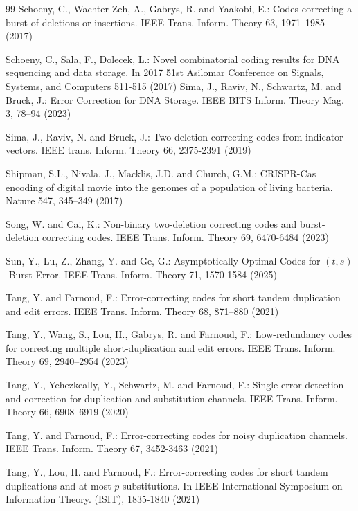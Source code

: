 \documentclass[pdflatex,sn-mathphys-num]{sn-jnl}
\theoremstyle{theorem}%
\theoremstyle{definition}
\theoremstyle{construction}
\newtheorem{open problem}{Open problem}
\begin{document}
\begin{thebibliography}{99}
		Schoeny, C., Wachter-Zeh, A., Gabrys, R. and Yaakobi, E.: 
		Codes correcting a burst of deletions or insertions. 
		IEEE Trans. Inform. Theory 63, 1971–1985 (2017)
		
		Schoeny, C., Sala, F., Dolecek, L.: Novel combinatorial coding results for DNA sequencing and data storage. In 2017 51st Asilomar Conference on Signals, Systems, and Computers 511-515 (2017)
		Sima, J., Raviv, N., Schwartz, M. and Bruck, J.: 
		Error Correction for DNA Storage. 
		IEEE BITS Inform. Theory Mag. 3, 78–94 (2023)
		
		Sima, J., Raviv, N. and Bruck, J.: Two deletion correcting codes from indicator vectors. IEEE trans. Inform. Theory 66, 2375-2391 (2019)
		
		Shipman, S.L., Nivala, J., Macklis, J.D. and Church, G.M.:
		CRISPR-Cas encoding of digital movie into the genomes of a population of living bacteria. 
		Nature 547, 345–349 (2017)
		
		Song, W. and Cai, K.: Non-binary two-deletion correcting codes and burst-deletion correcting codes. IEEE Trans. Inform. Theory 69, 6470-6484 (2023)
		
		 Sun, Y.,  Lu, Z., Zhang, Y. and Ge, G.: Asymptotically Optimal Codes for $(t, s)$-Burst Error. IEEE Trans. Inform. Theory 71, 1570-1584 (2025)

		
		Tang, Y. and Farnoud, F.: 
		Error-correcting codes for short tandem duplication and edit errors. 
		IEEE Trans. Inform. Theory 68, 871–880 (2021)
		
		Tang, Y., Wang, S., Lou, H., Gabrys, R. and Farnoud, F.: 
		Low-redundancy codes for correcting multiple short-duplication and edit errors. 
		IEEE Trans. Inform. Theory 69, 2940–2954 (2023)
		
		Tang, Y., Yehezkeally, Y., Schwartz, M. and Farnoud, F.: 
		Single-error detection and correction for duplication and substitution channels. 
		IEEE Trans. Inform. Theory 66, 6908–6919 (2020)
		
		Tang, Y. and Farnoud, F.:
		Error-correcting codes for noisy duplication channels.
		IEEE Trans. Inform. Theory  67, 3452-3463 (2021)
		
		Tang, Y., Lou, H. and Farnoud, F.: Error-correcting codes for short tandem duplications and at most $ p $ substitutions. In IEEE International Symposium on Information Theory. (ISIT), 1835-1840 (2021)
		

\end{thebibliography}
\end{document}
